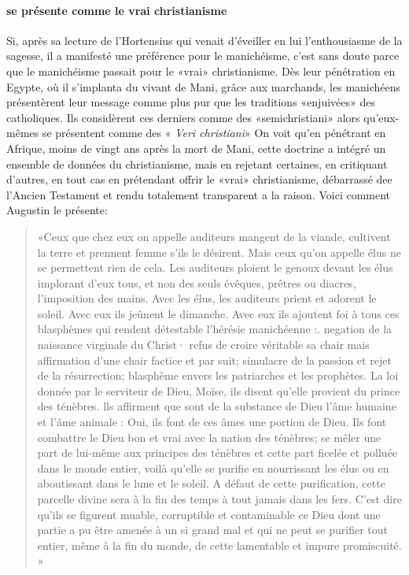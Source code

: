 \paragraph{se présente comme le vrai christianisme}	Si, après sa lecture de l'Hortensius qui venait d'éveiller en lui l'enthousiasme de la sagesse, il a manifesté une préférence pour le manichéisme, c'est sans doute parce que le manichéisme passait pour le «vrai» christianisme. Dès leur pénétration en Egypte, où il s'implanta du vivant de Mani, grâce aux marchands, les manichéens présentèrent leur message comme plus pur que les traditions «enjuivées» des catholiques. Ils considèrent ces derniers comme  des «semichristiani» alors qu'eux-mêmes se présentent comme des « \textit{Veri christiani}»   On voit	qu'en pénétrant en Afrique, moins de vingt ans après la mort de Mani, cette doctrine a
intégré	un ensemble de données du christianisme, mais en	rejetant certaines, en
critiquant d'autres, en tout cas en prétendant offrir le  «vrai» christianisme, débarrassé dee l'Ancien Testament et rendu totalement transparent a la raison.
Voici comment Augustin le présente:	
\begin{quote}
    «Ceux que chez eux on appelle auditeurs mangent de la viande, cultivent la terre et prennent femme s'ils le désirent. Mais ceux qu'on appelle élus ne se permettent rien de cela. Les auditeurs ploient le genoux devant les élus implorant d'eux tous, et non des seuls évêques, prêtres ou diacres, l'imposition des mains. Avec les élus, les auditeurs prient et adorent le soleil. Avec eux ils jeûnent le dimanche. Avec eux ils ajoutent foi à tous ces blasphèmes qui rendent détestable l'hérésie manichéenne :. negation de la naissance virginale du Christ· refus de croire véritable sa chair mais affirmation d'une chair factice et par suit; simulacre de la passion et rejet de la résurrection; blasphème envers les patriarches et les prophètes. La loi donnée par le serviteur de Dieu, Moïse, ils disent qu'elle provient du prince des ténèbres. lls affirment que sont de la substance de Dieu l'âme humaine et l'âme animale : Oui, ils
font de ces âmes une portion de Dieu. Ils font combattre le Dieu bon et vrai avec la nation des ténèbres; se mêler une part de lui-même aux principes des ténèbres et cette part ficelée et polluée dans le monde entier, voilà qu'elle se purifie en nourrissant les élus ou en aboutissant dans le lune et le soleil. A défaut de cette purification, cette parcelle divine sera à la fin des temps à tout jamais dans les fers. C'est dire qu'ils se figurent muable, corruptible et contaminable ce Dieu dont une partie a pu être amenée à un si grand mal et qui ne peut se purifier tout entier, même à la fin du monde, de cette lamentable et impure promiscuité. »
\end{quote}


